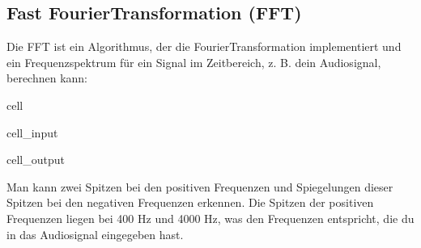 \documentclass[letterpaper,10pt,english]{jupyterBook}
\begin{document}
\subsection{Fast Fourier\sphinxhyphen{}Transformation (FFT)}
\label{\detokenize{content/T_Spektralanalyse_Audio:fast-fourier-transformation-fft}}
\sphinxAtStartPar
Die FFT ist ein Algorithmus, der die Fourier\sphinxhyphen{}Transformation implementiert und ein Frequenzspektrum für ein Signal im Zeitbereich, z. B. dein Audiosignal, berechnen kann:

\begin{sphinxuseclass}{cell}\begin{sphinxVerbatimInput}

\begin{sphinxuseclass}{cell_input}
\begin{sphinxVerbatim}[commandchars=\\\{\}]
    

    

  
     

  
\end{sphinxVerbatim}

\end{sphinxuseclass}\end{sphinxVerbatimInput}
\begin{sphinxVerbatimOutput}

\begin{sphinxuseclass}{cell_output}
\noindent{}

\end{sphinxuseclass}\end{sphinxVerbatimOutput}

\end{sphinxuseclass}
\sphinxAtStartPar
Man kann zwei Spitzen bei den positiven Frequenzen und Spiegelungen dieser Spitzen bei den negativen Frequenzen erkennen. Die Spitzen der positiven Frequenzen liegen bei 400 Hz und 4000 Hz, was den Frequenzen entspricht, die du in das Audiosignal eingegeben hast.
\end{document}
